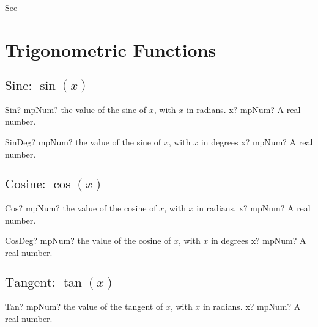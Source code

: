 See \cite{Corless96onthe}





\section{Trigonometric Functions}
\label{TrigonometricFunctions}


\subsection{\texorpdfstring{$\text{Sine: }\sin(x)$}{sin}}

\begin{mpFunctionsExtract}
	\mpFunctionOne
	{Sin? mpNum? the value of the sine of $x$, with $x$ in radians.}
	{x? mpNum? A real number.}
\end{mpFunctionsExtract}

\vspace{0.6cm}
\begin{mpFunctionsExtract}
	\mpFunctionOne
	{SinDeg? mpNum? the value of the sine of $x$, with $x$ in degrees}
	{x? mpNum? A real number.}
\end{mpFunctionsExtract}



\subsection{\texorpdfstring{$\text{Cosine: }\cos(x)$}{cos}}

\begin{mpFunctionsExtract}
	\mpFunctionOne
	{Cos? mpNum? the value of the cosine of $x$, with $x$ in radians.}
	{x? mpNum? A real number.}
\end{mpFunctionsExtract}

\vspace{0.6cm}

\begin{mpFunctionsExtract}
	\mpFunctionOne
	{CosDeg? mpNum? the value of the cosine of $x$, with $x$ in degrees}
	{x? mpNum? A real number.}
\end{mpFunctionsExtract}




\subsection{\texorpdfstring{$\text{Tangent: }\tan(x)$}{tan}}

\begin{mpFunctionsExtract}
	\mpFunctionOne
	{Tan? mpNum? the value of the tangent of $x$, with $x$ in radians.}
	{x? mpNum? A real number.}
\end{mpFunctionsExtract}

